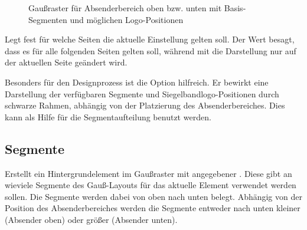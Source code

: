 \begin{figure}[!ht]\centering
  \begin{minipage}{0.35\textwidth}
    \label{fig:gausslayout:topsender}
  \end{minipage}
  \quad
  \begin{minipage}{0.35\textwidth}
    \label{fig:gausslayout:bottomsender}
  \end{minipage}
  \caption{Gaußraster für Absenderbereich oben bzw. unten mit Basis-Segmenten
  und möglichen Logo-Positionen}\label{fig:gausspage}
\end{figure}

\begin{Declaration}
\end{Declaration}

Legt fest für welche Seiten die aktuelle Einstellung gelten soll.
Der Wert  besagt, dass es für alle folgenden Seiten gelten soll,
während mit  die Darstellung nur auf der aktuellen Seite geändert 
wird.

\begin{Declaration}
\end{Declaration}

Besonders für den Designprozess ist die Option 
hilfreich. Er bewirkt eine Darstellung der verfügbaren Segmente und
Siegelbandlogo-Positionen durch schwarze Rahmen,
abhängig von der Platzierung des Absenderbereiches.
Dies kann als Hilfe für die Segmentaufteilung benutzt werden.


\subsection{Segmente}\label{sec:gausslayout:bgsegment}

\begin{Declaration}
\end{Declaration}

Erstellt ein Hintergrundelement im Gaußraster mit angegebener .
Diese gibt an wieviele Segmente des Gauß-Layouts für das aktuelle Element
verwendet werden sollen.
Die Segmente werden dabei von oben nach unten belegt.
Abhängig von der Position des Absenderbereiches werden die Segmente
entweder nach unten kleiner (Absender oben) oder größer (Absender unten).

